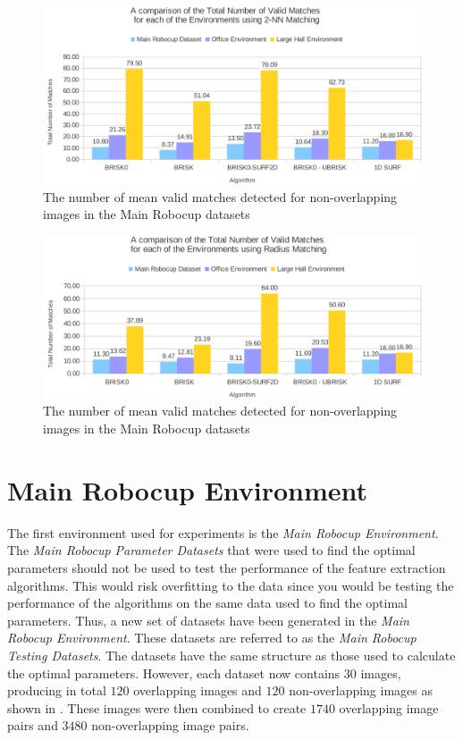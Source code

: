 \documentclass[11pt]{report}
\begin{document}
\begin{figure}
  \centering
    \includegraphics[width=1.0\textwidth]{../Drawings/Graphs/overall_nvm.pdf}
    \caption{The number of mean valid matches detected for non-overlapping images in the Main Robocup datasets} 
    \label{fig:overall_nvm}
\end{figure}

\begin{figure}
  \centering
    \includegraphics[width=1.0\textwidth]{../Drawings/Graphs/overall_nvm_radius.pdf}
    \caption{The number of mean valid matches detected for non-overlapping images in the Main Robocup datasets} 
    \label{fig:overall_nvm_radius}
\end{figure}

\section{Main Robocup Environment}
\label{sec:mrdPerformance}
The first environment used for experiments is the \textit{Main Robocup Environment}. The \textit{Main Robocup Parameter Datasets} that were used to find the optimal parameters should not be used to test the performance of the feature extraction algorithms. This would risk overfitting to the data since you would be testing the performance of the algorithms on the same data used to find the optimal parameters. Thus, a new set of datasets have been generated in the \textit{Main Robocup Environment}. These datasets are referred to as the \textit{Main Robocup Testing Datasets}. The datasets have the same structure as those used to calculate the optimal parameters. However, each dataset now contains $30$ images, producing in total $120$ overlapping images and $120$ non-overlapping images as shown in . These images were then combined to create $1740$ overlapping image pairs and $3480$ non-overlapping image pairs.\\
\end{document}
